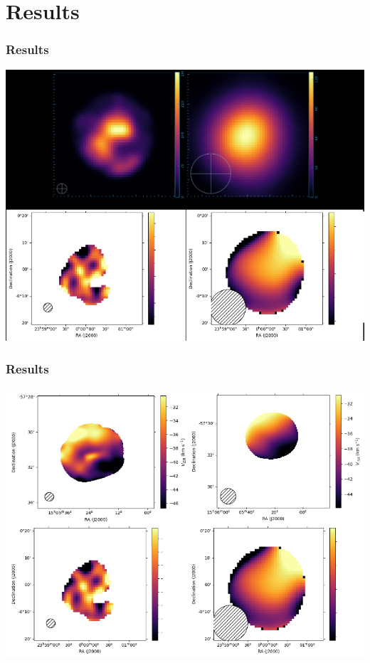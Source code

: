 \documentclass[aspectratio=169,compress]{beamer}
\begin{document}
\section{Results}
\begin{frame}
  \frametitle{Results}
  \includegraphics[width=0.6\linewidth]{figures/blurringeffect.png}
\end{frame}

\begin{frame}
  \frametitle{Results}
  \includegraphics[width=0.6\linewidth]{figures/blurringcomp.png}
\end{frame}
\end{document}
